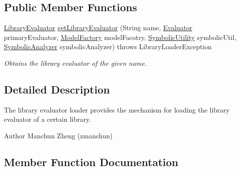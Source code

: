 \subsection*{Public Member Functions}
\begin{DoxyCompactItemize}
\item 
\hyperlink{interfaceedu_1_1udel_1_1cis_1_1vsl_1_1civl_1_1semantics_1_1IF_1_1LibraryEvaluator}{Library\+Evaluator} \hyperlink{interfaceedu_1_1udel_1_1cis_1_1vsl_1_1civl_1_1semantics_1_1IF_1_1LibraryEvaluatorLoader_a8f44b595a82b95ef30d174fb725a1f7a}{get\+Library\+Evaluator} (String name, \hyperlink{interfaceedu_1_1udel_1_1cis_1_1vsl_1_1civl_1_1semantics_1_1IF_1_1Evaluator}{Evaluator} primary\+Evaluator, \hyperlink{interfaceedu_1_1udel_1_1cis_1_1vsl_1_1civl_1_1model_1_1IF_1_1ModelFactory}{Model\+Factory} model\+Facotry, \hyperlink{interfaceedu_1_1udel_1_1cis_1_1vsl_1_1civl_1_1dynamic_1_1IF_1_1SymbolicUtility}{Symbolic\+Utility} symbolic\+Util, \hyperlink{interfaceedu_1_1udel_1_1cis_1_1vsl_1_1civl_1_1semantics_1_1IF_1_1SymbolicAnalyzer}{Symbolic\+Analyzer} symbolic\+Analyzer)  throws Library\+Loader\+Exception
\begin{DoxyCompactList}\small\item\em Obtains the library evaluator of the given name. \end{DoxyCompactList}\end{DoxyCompactItemize}


\subsection{Detailed Description}
The library evaluator loader provides the mechanism for loading the library evaluator of a certain library. 

\begin{DoxyAuthor}{Author}
Manchun Zheng (zmanchun) 
\end{DoxyAuthor}


\subsection{Member Function Documentation}
\hypertarget{interfaceedu_1_1udel_1_1cis_1_1vsl_1_1civl_1_1semantics_1_1IF_1_1LibraryEvaluatorLoader_a8f44b595a82b95ef30d174fb725a1f7a}{}
